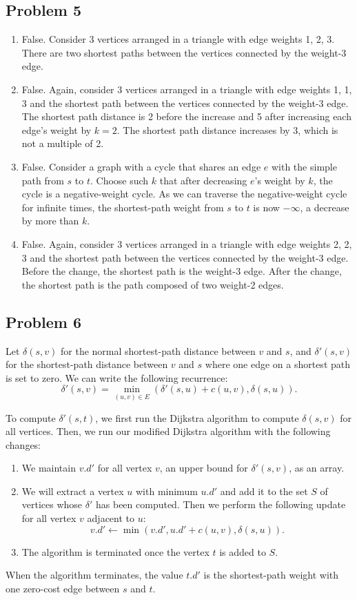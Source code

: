 \documentclass{article}
\begin{document}
\subsection*{Problem 5}

\begin{enumerate}
    \item False. Consider 3 vertices arranged in a triangle with edge weights 1, 2, 3. There are two shortest paths between the vertices connected by the weight-3 edge.
    \item False. Again, consider 3 vertices arranged in a triangle with edge weights 1, 1, 3 and the shortest path between the vertices connected by the weight-3 edge. The shortest path distance is 2 before the increase and 5 after increasing each edge's weight by $k = 2$. The shortest path distance increases by 3, which is not a multiple of 2.
    \item False. Consider a graph with a cycle that shares an edge $e$ with the simple path from $s$ to $t$. Choose such $k$ that after decreasing $e$'s weight by $k$, the cycle is a negative-weight cycle. As we can traverse the negative-weight cycle for infinite times, the shortest-path weight from $s$ to $t$ is now $-\infty$, a decrease by more than $k$.
    \item False. Again, consider 3 vertices arranged in a triangle with edge weights 2, 2, 3 and the shortest path between the vertices connected by the weight-3 edge. Before the change, the shortest path is the weight-3 edge. After the change, the shortest path is the path composed of two weight-2 edges.
\end{enumerate}

\subsection*{Problem 6}

Let $\delta(s, v)$ for the normal shortest-path distance between $v$ and $s$, and $\delta'(s, v)$ for the shortest-path distance between $v$ and $s$ where one edge on a shortest path is set to zero. We can write the following recurrence:
\[
    \delta'(s, v) = \min_{(u, v) \in E}(\delta'(s, u) + c(u, v), \delta(s, u)).
\]

To compute $\delta'(s, t)$, we first run the Dijkstra algorithm to compute $\delta(s, v)$ for all vertices. Then, we run our modified Dijkstra algorithm with the following changes:
\begin{enumerate}
    \item We maintain $v.d'$ for all vertex $v$, an upper bound for $\delta'(s, v)$, as an array.
    \item We will extract a vertex $u$ with minimum $u.d'$ and add it to the set $S$ of vertices whose $\delta'$ has been computed. Then we perform the following update for all vertex $v$ adjacent to $u$:
    \[
        v.d' \gets \min(v.d', u.d' + c(u, v), \delta(s, u)).
    \]
    \item The algorithm is terminated once the vertex $t$ is added to $S$.
\end{enumerate}

When the algorithm terminates, the value $t.d'$ is the shortest-path weight with one zero-cost edge between $s$ and $t$.
\end{document}
